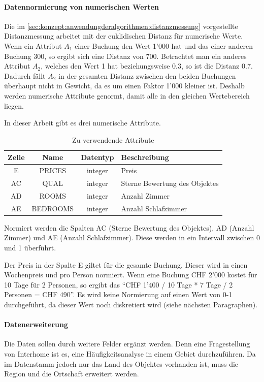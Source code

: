 \paragraph{Datennormierung von numerischen Werten} Die im \cref{sec:konzept:anwendungderalgorithmen:distanzmessung} vorgestellte Distanzmessung arbeitet mit der euklidischen Distanz für numerische Werte. Wenn ein Attribut $A_1$ einer Buchung den Wert 1'000 hat und das einer anderen Buchung 300, so ergibt sich eine Distanz von 700. Betrachtet man ein anderes Attribut $A_2$, welches den Wert 1 hat beziehungsweise 0.3, so ist die Distanz 0.7. Dadurch fällt $A_2$ in der gesamten Distanz zwischen den beiden Buchungen überhaupt nicht in Gewicht, da es um einen Faktor 1'000 kleiner ist. Deshalb werden numerische Attribute genormt, damit alle in den gleichen Wertebereich liegen.

In dieser Arbeit gibt es drei numerische Attribute.
\begin{table}[H] 
	\caption{Zu verwendende Attribute}
	\centering
		\label{fig:recherche:attributeinschraenkung:2}
	\begin{tabular}{ | c | c | c | l | } 
		\hline 
		\rowcolor{tableheadcolor}
		\bfseries Zelle & \bfseries Name & \bfseries Datentyp & \bfseries Beschreibung \\ \hline 
		E & PRICES & integer & Preis \\ \hline 
		AC & QUAL & integer & Sterne Bewertung des Objektes \\ \hline 
		AD & ROOMS & integer & Anzahl Zimmer \\ \hline 
		AE & BEDROOMS & integer & Anzahl Schlafzimmer \\ \hline 
	\end{tabular}
\end{table}

Normiert werden die Spalten AC (Sterne Bewertung des Objektes), AD (Anzahl Zimmer) und AE (Anzahl Schlafzimmer). Diese werden in ein Intervall zwischen 0 und 1 überführt.

Der Preis in der Spalte E giltet für die gesamte Buchung. Dieser wird in einen Wochenpreis und pro Person normiert. Wenn eine Buchung CHF 2'000 kostet für 10 Tage für 2 Personen, so ergibt das "`CHF 1'400 / 10 Tage * 7 Tage / 2 Personen = CHF 490"'. Es wird keine Normierung auf einen Wert von 0-1 durchgeführt, da dieser Wert noch diskretiert wird (siehe nächsten Paragraphen).

\paragraph{Datenerweiterung} Die Daten sollen durch weitere Felder ergänzt werden. Denn eine Fragestellung von Interhome ist es, eine Häufigkeitsanalyse in einem Gebiet durchzuführen. Da im Datenstamm jedoch nur das Land des Objektes vorhanden ist, muss die Region und die Ortschaft erweitert werden. 

